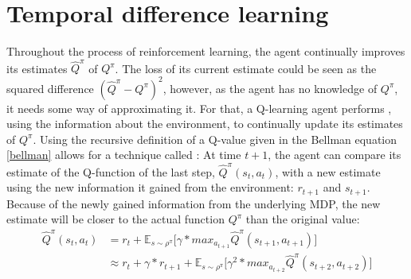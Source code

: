 \section{Temporal difference learning}



Throughout the process of reinforcement learning, the agent continually improves its estimates $\hat{Q}^\pi$ of $Q^\pi$. The loss of its current estimate could be seen as the squared difference $(\hat{Q}^\pi - Q^\pi)^2$, however, as the agent has no knowledge of $Q^\pi$, it needs some way of approximating it. For that, a Q-learning agent performs , using the information about the environment, to continually update its estimates of $Q^\pi$.
\noindent Using the recursive definition of a Q-value given in the Bellman equation \ref{bellman} allows for a technique called \cite{sutton_learning_1988}: At time $t+1$, the agent can compare its estimate of the Q-function of the last step, $\hat{Q}^\pi(s_t, a_t)$, with a new estimate using the new information it gained from the environment: $r_{t+1}$ and $s_{t+1}$.  Because of the newly gained information from the underlying MDP, the new estimate will be closer to the actual function $Q^\pi$ than the original value:
\begin{align} 
	\hat{Q}^\pi(s_t,a_t) &= r_t + \mathds{E}_{s\sim\rho^\pi} \big[ \gamma * max_{a_{t+1}} \hat{Q}^\pi(s_{t+1},a_{t+1})  \big]\\
	                     &\approx r_t + \gamma * r_{t+1} + \mathds{E}_{s\sim\rho^\pi} \big[ \gamma^2 * max_{a_{t+2}} \hat{Q}^\pi(s_{t+2},a_{t+2})  \big] \label{bellmanmal2}
\end{align}

